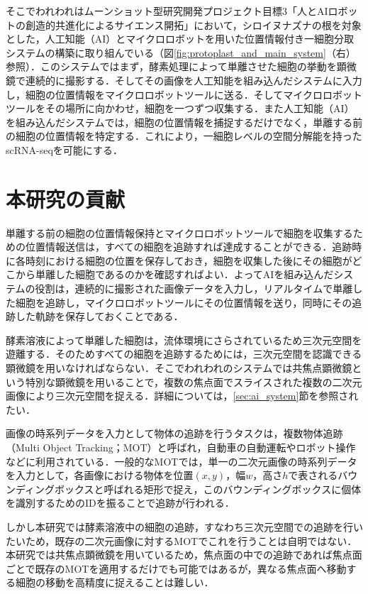 そこでわれわれはムーンショット型研究開発プロジェクト目標3「人とAIロボットの創造的共進化によるサイエンス開拓」\cite{moonshotHarada}において，シロイヌナズナの根を対象とした，人工知能（AI）とマイクロロボット\cite{ando2024single}を用いた位置情報付き一細胞分取システムの構築に取り組んでいる（図\ref{fig:protoplast_and_main_system}（右）参照）．このシステムではまず，酵素処理によって単離させた細胞の挙動を顕微鏡で連続的に撮影する．そしてその画像を人工知能を組み込んだシステムに入力し，細胞の位置情報をマイクロロボットツールに送る．そしてマイクロロボットツールをその場所に向かわせ，細胞を一つずつ収集する．また人工知能（AI）を組み込んだシステムでは，細胞の位置情報を捕捉するだけでなく，単離する前の細胞の位置情報を特定する．これにより，一細胞レベルの空間分解能を持ったscRNA-seqを可能にする．

\section{本研究の貢献}
\label{sec:contribution}

単離する前の細胞の位置情報保持とマイクロロボットツールで細胞を収集するための位置情報送信は，すべての細胞を追跡すれば達成することができる．追跡時に各時刻における細胞の位置を保存しておき，細胞を収集した後にその細胞がどこから単離した細胞であるのかを確認すればよい．よってAIを組み込んだシステムの役割は，連続的に撮影された画像データを入力し，リアルタイムで単離した細胞を追跡し，マイクロロボットツールにその位置情報を送り，同時にその追跡した軌跡を保存しておくことである．

酵素溶液によって単離した細胞は，流体環境にさらされているため三次元空間を遊離する．そのためすべての細胞を追跡するためには，三次元空間を認識できる顕微鏡を用いなければならない．そこでわれわれのシステムでは共焦点顕微鏡という特別な顕微鏡を用いることで，複数の焦点面でスライスされた複数の二次元画像により三次元空間を捉える．詳細については，\ref{sec:ai_system}節を参照されたい．

画像の時系列データを入力として物体の追跡を行うタスクは，複数物体追跡（Multi Object Tracking；MOT）と呼ばれ，自動車の自動運転やロボット操作などに利用されている．一般的なMOTでは，単一の二次元画像の時系列データを入力として，各画像における物体を位置$(x, y)$，幅$w$，高さ$h$で表されるバウンディングボックスと呼ばれる矩形で捉え，このバウンディングボックスに個体を識別するためのIDを振ることで追跡が行われる．

しかし本研究では酵素溶液中の細胞の追跡，すなわち三次元空間での追跡を行いたいため，既存の二次元画像に対するMOTでこれを行うことは自明ではない．本研究では共焦点顕微鏡を用いているため，焦点面の中での追跡であれば焦点面ごとで既存のMOTを適用するだけでも可能ではあるが，異なる焦点面へ移動する細胞の移動を高精度に捉えることは難しい．


